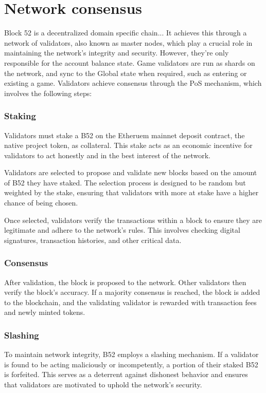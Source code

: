 \documentclass{article}
\begin{document}
\section{Network consensus}
Block 52 is a decentralized domain specific chain... It achieves this through a network of validators, also known as master nodes, which play a crucial role in maintaining the network's integrity and security. However, they're only responsible for the account balance state.  Game validators are run as shards on the network, and sync to the Global state when required, such as entering or existing a game.  Validators achieve consensus through the PoS mechanism, which involves the following steps:

\subsubsection*{Staking}
Validators must stake a B52 on the Etheruem mainnet deposit contract, the native project token, as collateral. This stake acts as an economic incentive for validators to act honestly and in the best interest of the network.

Validators are selected to propose and validate new blocks based on the amount of B52 they have staked. The selection process is designed to be random but weighted by the stake, ensuring that validators with more at stake have a higher chance of being chosen.

Once selected, validators verify the transactions within a block to ensure they are legitimate and adhere to the network's rules. This involves checking digital signatures, transaction histories, and other critical data.

\subsubsection*{Consensus}
After validation, the block is proposed to the network. Other validators then verify the block's accuracy. If a majority consensus is reached, the block is added to the blockchain, and the validating validator is rewarded with transaction fees and newly minted tokens.

\subsubsection*{Slashing}
To maintain network integrity, B52 employs a slashing mechanism. If a validator is found to be acting maliciously or incompetently, a portion of their staked B52 is forfeited. This serves as a deterrent against dishonest behavior and ensures that validators are motivated to uphold the network's security.
\end{document}
